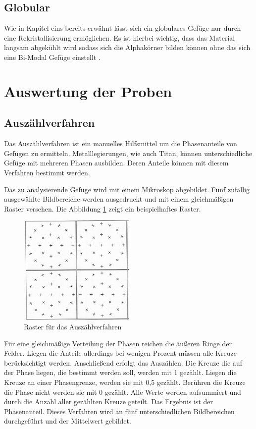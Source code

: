\documentclass[a4paper, 11pt]{tubsreprt}
\begin{document}
\subsection{Globular}
Wie in Kapitel eins bereits erwähnt lässt sich ein globulares Gefüge nur durch eine Rekristallisierung ermöglichen. Es ist hierbei wichtig, dass das Material langsam abgekühlt wird sodass sich die Alphakörner bilden können ohne das sich eine Bi-Modal Gefüge einstellt \cite{Luetjering2007}.

\section{Auswertung der Proben}
\subsection{Auszählverfahren}
Das Auszählverfahren ist ein manuelles Hilfsmittel um die Phasenanteile von Gefügen zu ermitteln. Metalllegierungen, wie auch Titan, können unterschiedliche Gefüge mit mehreren Phasen ausbilden. Deren Anteile können mit diesem Verfahren bestimmt werden.

Das zu analysierende Gefüge wird mit einem Mikroskop abgebildet. Fünf zufällig ausgewählte Bildbereiche werden ausgedruckt und mit einem gleichmäßigen Raster versehen. Die Abbildung \ref{Raster für das Auszählverfahren} zeigt ein beispielhaftes Raster.
\begin{figure} %
\centering
\includegraphics[width=0.5\textwidth]{Bilder/Raster.png}
\caption{Raster für das Auszählverfahren}
\label{Raster für das Auszählverfahren}
\end{figure}

Für eine gleichmäßige Verteilung der Phasen reichen die äußeren Ringe der Felder. Liegen die Anteile allerdings bei wenigen Prozent müssen alle Kreuze berücksichtigt werden. 
Anschließend erfolgt das Auszählen. Die Kreuze die auf der Phase liegen, die bestimmt werden soll, werden mit 1 gezählt. Liegen die Kreuze an einer Phasengrenze, werden sie mit 0,5 gezählt. Berühren die Kreuze die Phase nicht werden sie mit 0 gezählt. Alle Werte werden aufsummiert und durch die Anzahl aller gezählten Kreuze geteilt. Das Ergebnis ist der Phasenanteil. Dieses Verfahren wird an fünf unterschiedlichen Bildbereichen durchgeführt und der Mittelwert gebildet.
\end{document}
